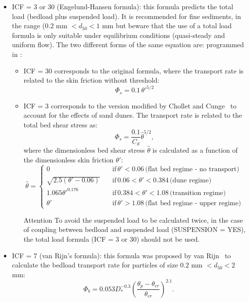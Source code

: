 \begin{itemize}
\item {\ttfamily ICF = 3 or 30} (Engelund-Hansen formula): this formula predicts the total load (bedload plus suspended load). It is recommended for fine sediments, in the
range ($0.2$ mm $< d_{50} < 1$ mm but beware that the use of
a total load formula is only suitable under equilibrium conditions (quasi-steady and uniform flow). 
The two different forms of the same equation are:
programmed in \sisyphe:
\begin{itemize}
 \item {\ttfamily ICF = 30} corresponds to the original formula, where the
transport rate is related to the skin friction without threshold:
\begin{equation}\label{eq:EH1}
\Phi_s = 0.1\,\theta'^{5/2} 
\end{equation}
\item {\ttfamily ICF = 3} corresponds to the version modified by Chollet and
Cunge~\cite{Chollet} to account for the effects of sand dunes. The transport rate is related to the total bed shear stress as:
\begin{equation}\label{eq:EH2}
\Phi_s = \frac{0.1}{C_d} \hat{\theta}^{5/2}, 
\end{equation}
where the dimensionless bed shear stress $\hat \theta$ is calculated as a function of the dimensionless skin friction $\theta'$:
\begin{equation*}
\hat{\theta}=\left\{\begin{array}{ll}
0 &\quad \text{if}\,\theta' < 0.06\,\text{(flat bed regime - no transport)} \\ 
\sqrt{2.5(\theta'-0.06)} &\quad \text{if}\, 0.06 < \theta' < 0.384\,\text{(dune regime)} \\ 
1.065\theta'^{0.176} &\quad \text{if}\, 0.384 < \theta' < 1.08\,\text{(transition regime)} \\ 
\theta' &\quad \text{if}\,\theta' > 1.08\,\text{(flat bed regime - upper regime)}
\end{array}
\right.
\end{equation*}

\begin{bclogo}[couleur = blue!10, arrondi = 0.10, logo = \bcattention]{\textsf{Attention}}
To avoid the suspended load to be calculated twice, in the case of coupling between bedload and suspended load ({\ttfamily SUSPENSION = YES}), the total load formula ({\ttfamily ICF = 3 or 30}) should not be used.
\end{bclogo}

\end{itemize}

\item {\ttfamily ICF = 7} (van Rijn's formula): this formula was proposed by van Rijn~\cite{vanRijn84} to calculate the
bedload transport rate for particles of size $0.2$ mm $< d_{50} < 2$ mm:
\begin{equation}\label{eq:vR}
\Phi_b = 0.053 D_*^{-0.3} \left( \frac{\theta_p-\theta_{cr}}{\theta_{cr}} \right)^{2.1}.
\end{equation}
\end{itemize}

